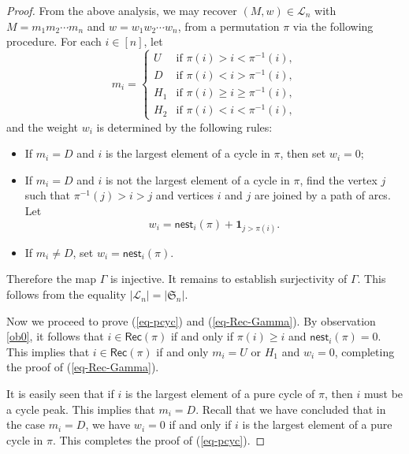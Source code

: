 \documentclass[12pt]{article}
\numberwithin{equation}{section}
\theoremstyle{plain}
\def\Rec{\mathsf{Rec}}
\def\nest{\mathsf{nest}}
\begin{document}
\begin{proof}
    	 		From the above analysis, we may recover $(M,w)\in \mathcal{L}_n$ with $M=m_1m_2\cdots m_n$ and $w=w_1w_2\cdots w_n$, from a permutation $\pi$ via the following procedure.
    	 		For each $i\in [n]$, let
    	 		\[
    	 		m_i=
    	 		\begin{cases}
    	 			U & \text{if } \pi(i)>i<\pi^{-1}(i), \\
    	 			D & \text{if } \pi(i)<i>\pi^{-1}(i), \\
    	 			H_1 & \text{if } \pi(i)\geq i\geq \pi^{-1}(i), \\
    	 			H_2 & \text{if } \pi(i)<i<\pi^{-1}(i),
    	 		\end{cases}
    	 		\]
    	 		and the weight $w_i$ is determined by the following rules:
    	 		\begin{itemize}
    	 			\item If $m_i=D$ and $i$ is the largest element of a cycle in $\pi$, then set $w_i=0$;
    	 			\item If $m_i=D$ and $i$ is not the largest element of a cycle in $\pi$, find the vertex $j$ such that $\pi^{-1}(j)>i>j$ and vertices $i$ and $j$ are joined by a path of arcs. Let
    	 			\[
    	 			w_i=\nest_i(\pi)+\mathbf{1}_{j>\pi(i)}.
    	 			\]
    	 			\item If $m_i\neq D$, set $w_i=\nest_i(\pi)$.
    	 		\end{itemize}
    	 		Therefore the map $\Gamma$ is injective. It remains to establish surjectivity of $\Gamma$. This follows from the equality $|\mathcal{L}_n|=|\mathfrak{S}_n|$.
    	 		
    	 		Now we proceed to prove (\ref{eq-pcyc}) and  (\ref{eq-Rec-Gamma}). By observation \ref{ob0},  it follows   that $i\in \Rec(\pi)$ if and only if $\pi(i)\geq i$ and $\nest_i(\pi)=0$. This implies that $i\in \Rec(\pi)$ if and only  $m_i=U$ or $H_1$ and $w_i=0$, completing the proof of (\ref{eq-Rec-Gamma}). 
    	 		
    	 		It is easily seen that if  $i$ is the largest element of a pure cycle  of $\pi$, then  $i$ must be   a cycle peak. This implies that $m_i=D$. Recall that we have concluded that in the case $m_i = D$, we have $w_i = 0$ if and only if $i$ is the largest element of a pure cycle in $\pi$.  This completes the proof of  (\ref{eq-pcyc}). 
    	\end{proof}
    	 
\end{document}
